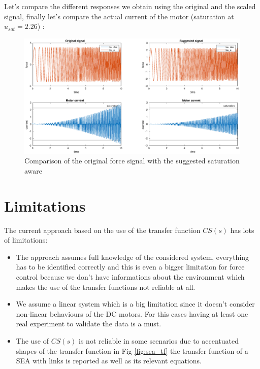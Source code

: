 \documentclass[a4paper,11pt]{article}
\begin{document}
\noindent Let's compare the different responses we obtain using the original and the scaled signal, finally let's compare the actual current of the motor (saturation at $u_{sat} = 2.26$) :

\begin{figure}[H]
  \begin{center}
  \hspace*{-5cm}
  \includegraphics[width=1.6\textwidth]{images/force_tau.eps}
  \end{center}
  \caption{Comparison of the original force signal with the suggested saturation aware}
  \label{fig:force_tau}
  \end{figure}

\section{Limitations}

The current approach based on the use of the transfer function $CS(s)$ has lots of limitations:
\begin{itemize}
  \item The approach assumes full knowledge of the considered system, everything has to be identified correctly and this is even a bigger limitation for force control because we don't have informations about the environment which makes the use of the transfer functions not reliable at all.
  \item We assume a linear system which is a big limitation since it doesn't consider non-linear behaviours of the DC motors. For this cases having at least one real experiment to validate the data is a must.
  \item The use of $CS(s)$ is not reliable in some scenarios due to accentuated shapes of the transfer function in Fig \ref{fig:sea_tf} the transfer function of a SEA with links is reported as well as its relevant equations.
\end{itemize}
\end{document}
